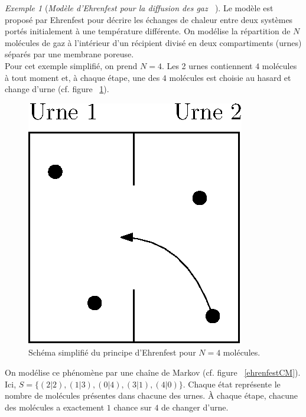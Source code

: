 \documentclass[12pt,a4paper]{report}
\theoremstyle{definition}%
\theoremstyle{remark}
\newtheorem{example}{Exemple}[chapter]
\newcommand{\cf}{cf. }
\begin{document}
\begin{example}[\textit{Modèle d'Ehrenfest pour la diffusion des gaz ~\cite{Course3}}]
	Le modèle est proposé par Ehrenfest pour décrire les échanges de chaleur entre deux systèmes portés initialement à une température différente. On modélise la répartition de $N$ molécules de gaz à l'intérieur d'un récipient divisé en deux compartiments (urnes) séparés par une membrane poreuse.\\
	Pour cet exemple simplifié, on prend $N = 4$. Les 2 urnes contiennent $4$ molécules à tout moment et, à chaque étape, une des $4$ molécules est choisie au hasard et change d'urne (\cf figure ~\ref{ehrenfestscheme}).
	\begin{figure}[H]
		\centering
		\includegraphics[scale=0.5]{figures/EhrenfestUrne.eps}
		\caption{Schéma simplifié du principe d'Ehrenfest pour $N=4$ molécules.}
		\label{ehrenfestscheme}
	\end{figure}

	On modélise ce phénomène par une chaîne de Markov (\cf figure ~\ref{ehrenfestCM}). Ici, $S=\{(2|2), (1|3), (0|4), (3|1), (4|0) \}$. Chaque état représente le nombre de molécules présentes dans chacune des urnes. \`A chaque étape, chacune des molécules a exactement $1$ chance sur $4$ de changer d'urne.


\end{example}
\end{document}
